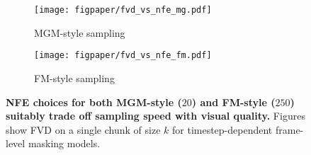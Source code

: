 \begin{figure}[ht!]
    \centering
    \begin{subfigure}[b]{0.495\columnwidth}
        \centering
        \texttt{[image: figpaper/fvd\_vs\_nfe\_mg.pdf]}
        \caption{MGM-style sampling}
        \label{fig:nfe_fvd_mgm}
    \end{subfigure}
    \hfill
    \begin{subfigure}[b]{0.495\columnwidth}
        \centering
        \texttt{[image: figpaper/fvd\_vs\_nfe\_fm.pdf]}
        \caption{FM-style sampling}
        \label{fig:nfe_fvd_fm}
    \end{subfigure}
    \caption{\textbf{NFE choices for both MGM-style ($20$) and FM-style ($250$) suitably trade off sampling speed with visual quality.} Figures show FVD on a single chunk of size $k$ for timestep-dependent frame-level masking models.}
    \vspace{-10pt}
    \label{fig:nfe_fvd}
\end{figure}













